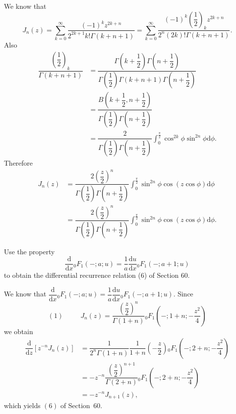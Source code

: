 \begin{solution}
We know that
$$J_n(z) = \displaystyle\sum_{k=0}^{\infty} \dfrac{(-1)^k z^{2k+n}}{2^{2k+1} k! \Gamma(k+n+1)} = \displaystyle\sum_{k=0}^{\infty} \dfrac{(-1)^k \left(\dfrac{1}{2} \right)_k z^{2k+n}}{2^n (2k)! \Gamma(k+n+1)}.$$
Also
$$\begin{array}{ll}
\dfrac{\left( \dfrac{1}{2} \right)_k}{\Gamma(k+n+1)} &= \dfrac{\Gamma \left( k + \dfrac{1}{2} \right) \Gamma \left( n + \dfrac{1}{2} \right)}{\Gamma \left( \dfrac{1}{2} \right) \Gamma(k+n+1) \Gamma \left( n + \dfrac{1}{2} \right)} \\
&= \dfrac{B \left( k + \dfrac{1}{2}, n + \dfrac{1}{2} \right)}{\Gamma \left( \dfrac{1}{2} \right) \Gamma \left( n + \dfrac{1}{2} \right)} \\
&= \dfrac{2}{\Gamma \left( \dfrac{1}{2} \right) \Gamma \left( n + \dfrac{1}{2} \right)} \displaystyle\int_0^{\frac{\pi}{2}} \cos^{2k} \phi \sin^{2n} \phi \mathrm{d} \phi.
\end{array}$$
Therefore
$$\begin{array}{ll}
J_n(z) &= \dfrac{2 \left( \dfrac{z}{2} \right)^n}{\Gamma \left( \dfrac{1}{2} \right) \Gamma \left( n + \dfrac{1}{2} \right)} \displaystyle\int_0^{\frac{\pi}{2}} \sin^{2n} \phi \cos(z \cos \phi) \mathrm{d} \phi \\
&= \dfrac{2 \left( \dfrac{z}{2} \right)^n}{\Gamma \left( \dfrac{1}{2} \right) \Gamma \left( n + \dfrac{1}{2} \right)} \displaystyle\int_0^{\frac{\pi}{2}} \sin^{2n} \phi \cos(z \cos \phi) \mathrm{d} \phi.
\end{array}$$
\end{solution}
\begin{problem} \label{problem11chapter6}
Use the property
$$\dfrac{\mathrm{d}}{\mathrm{d}x} {}_0F_1(-;a;u) = \dfrac{1}{a} \dfrac{\mathrm{d}u}{\mathrm{d}x} {}_0F_1(-;a+1;u)$$
to obtain the differential recurrence relation (6) of Section 60.
\end{problem}
\begin{solution}
We know that $\dfrac{\mathrm{d}}{\mathrm{d}x} {}_0F_1(-;a;u) = \dfrac{1}{a} \dfrac{\mathrm{d}u}{\mathrm{d}x} {}_0F_1 (-;a+1;u).$
Since
$$(1) \hspace{30pt} J_n(z) = \dfrac{\left( \dfrac{z}{2} \right)^n}{\Gamma(1 + n)} {}_0F_1 \left(-;1+n;-\dfrac{z^2}{4} \right)$$
we obtain
$$\begin{array}{ll}
\dfrac{\mathrm{d}}{\mathrm{d}z} \left[ z^{-n} J_n(z) \right] &= \dfrac{1}{2^n \Gamma(1+n)} \dfrac{1}{1+n} \left( - \dfrac{z}{2} \right) {}_0F_1 \left(-;2+n; - \dfrac{z^2}{4} \right) \\
&= -z^{-n} \dfrac{\left( \dfrac{z}{2} \right)^{n+1}}{\Gamma(2+n)} {}_0F_1 \left(-;2+n; -\dfrac{z^2}{4} \right) \\
&= - z^{-n} J_{n+1}(z),
\end{array}$$
which yields $(6)$ of Section~60.
\end{solution}
